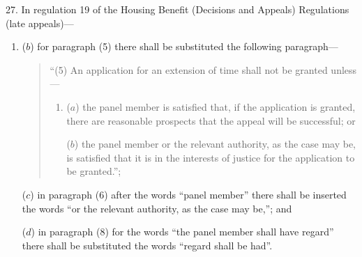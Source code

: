 \documentclass[12pt,a4paper]{article}
\begin{document}
27.  In regulation 19 of the Housing Benefit (Decisions and Appeals) Regulations (late appeals)—
\begin{enumerate}\item[]

($b$) for paragraph (5) there shall be substituted the following paragraph—
\begin{quotation}
“(5) An application for an extension of time shall not be granted unless—
\begin{enumerate}\item[]
($a$) the panel member is satisfied that, if the application is granted, there are reasonable prospects that the appeal will be successful; or

($b$) the panel member or the relevant authority, as the case may be, is satisfied that it is in the interests of justice for the application to be granted.”;
\end{enumerate}
\end{quotation}

($c$) in paragraph (6) after the words “panel member” there shall be inserted the words “or the relevant authority, as the case may be,”; and

($d$) in paragraph (8) for the words “the panel member shall have regard” there shall be substituted the words “regard shall be had”.
\end{enumerate}


%
%
\end{document}
